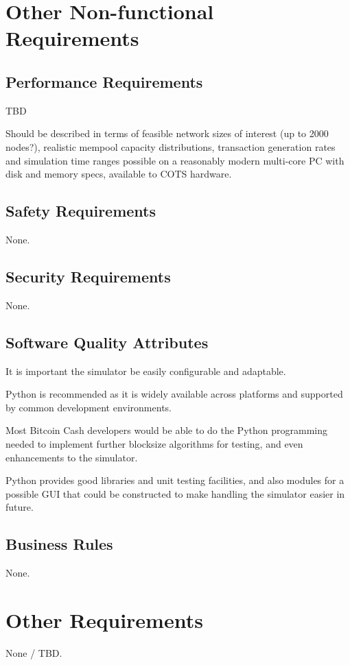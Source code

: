 \documentclass{scrreprt}
\begin{document}
\chapter{Other Non-functional Requirements}

\section{Performance Requirements}
TBD

Should be described in terms of feasible network sizes of interest (up to 2000 nodes?),
realistic mempool capacity distributions, transaction generation rates and simulation
time ranges possible on a reasonably modern multi-core PC with disk and memory specs,
available to COTS hardware.


\section{Safety Requirements}
None.

\section{Security Requirements}
None.

\section{Software Quality Attributes}
It is important the simulator be easily configurable and adaptable.

Python is recommended as it is widely available across platforms and supported
by common development environments.

Most Bitcoin Cash developers would be able to do the Python programming needed
to implement further blocksize algorithms for testing, and even enhancements
to the simulator.

Python provides good libraries and unit testing facilities, and also modules
for a possible GUI that could be constructed to make handling the simulator
easier in future.


\section{Business Rules}
None.


\chapter{Other Requirements}
None / TBD.
\end{document}
